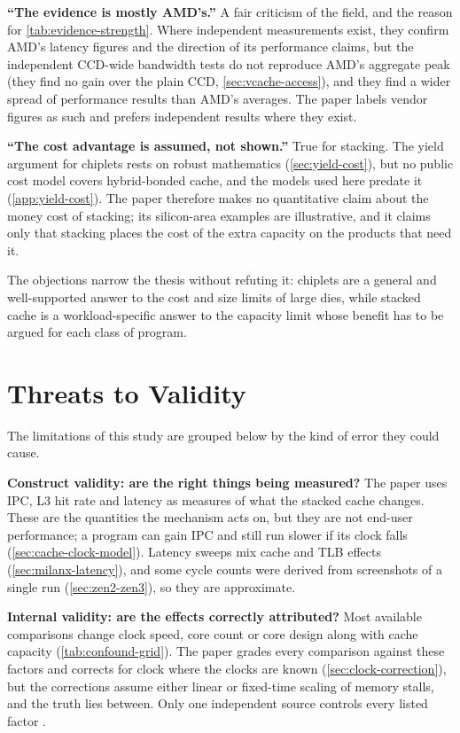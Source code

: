 \textbf{``The evidence is mostly AMD's.''} A fair criticism of the field, and the reason for \cref{tab:evidence-strength}. Where independent measurements exist, they confirm AMD's latency figures and the direction of its performance claims, but the independent CCD-wide bandwidth tests do not reproduce AMD's aggregate peak (they find no gain over the plain CCD, \cref{sec:vcache-access}), and they find a wider spread of performance results than AMD's averages. The paper labels vendor figures as such and prefers independent results where they exist.

\textbf{``The cost advantage is assumed, not shown.''} True for stacking. The yield argument for chiplets rests on robust mathematics (\cref{sec:yield-cost}), but no public cost model covers hybrid-bonded cache, and the models used here predate it (\cref{app:yield-cost}). The paper therefore makes no quantitative claim about the money cost of stacking; its silicon-area examples are illustrative, and it claims only that stacking places the cost of the extra capacity on the products that need it.

The objections narrow the thesis without refuting it: chiplets are a general and well-supported answer to the cost and size limits of large dies, while stacked cache is a workload-specific answer to the capacity limit whose benefit has to be argued for each class of program.

\section{Threats to Validity}
\label{sec:limitations}
The limitations of this study are grouped below by the kind of error they could cause.

\textbf{Construct validity: are the right things being measured?} The paper uses IPC, L3 hit rate and latency as measures of what the stacked cache changes. These are the quantities the mechanism acts on, but they are not end-user performance; a program can gain IPC and still run slower if its clock falls (\cref{sec:cache-clock-model}). Latency sweeps mix cache and TLB effects (\cref{sec:milanx-latency}), and some cycle counts were derived from screenshots of a single run (\cref{sec:zen2-zen3}), so they are approximate.

\textbf{Internal validity: are the effects correctly attributed?} Most available comparisons change clock speed, core count or core design along with cache capacity (\cref{tab:confound-grid}). The paper grades every comparison against these factors and corrects for clock where the clocks are known (\cref{sec:clock-correction}), but the corrections assume either linear or fixed-time scaling of memory stalls, and the truth lies between. Only one independent source controls every listed factor \cite{lamAMDs7950X3DZen2023}.

